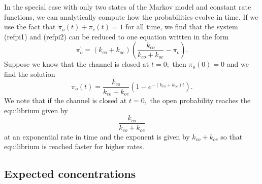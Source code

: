 In the special case with only two states of the Markov model and constant
rate functions, we can analytically compute how the probabilities evolve in
time. If we use the fact that $\pi_{o}\left(  t\right)  +\pi_{c}\left(
t\right)  =1$ for all time, we find that the system (ref{pi1})
and (ref{pi2}) can be reduced to one equation written in the form
\begin{equation}
\pi_{o}^{\prime}=\left(  k_{co}+k_{oc}\right)  \left(  \frac{k_{co}}
{k_{co}+k_{oc}}-\pi_{o}\right)  . \label{pi_o}
\end{equation}
Suppose we know that the channel is closed at $t=0;$ then $\pi_{o}(0)=0$ and
we find the solution
\begin{equation}
\pi_{o}(t)=\frac{k_{co}}{k_{co}+k_{oc}}\left(  1-e^{-\left(  k_{co}
+k_{oc}\right)  t}\right)  .\label{pio11}
\end{equation}
We note that if the channel is closed at $t=0,$ the open probability reaches
the equilibrium given by 
\[ \frac{k_{co}}{k_{co}+k_{oc}}\]
at an exponential rate in
time and the exponent is given by $ k_{co}+k_{oc}$ so
that equilibrium is reached faster for higher rates.


\subsection{Expected concentrations}

